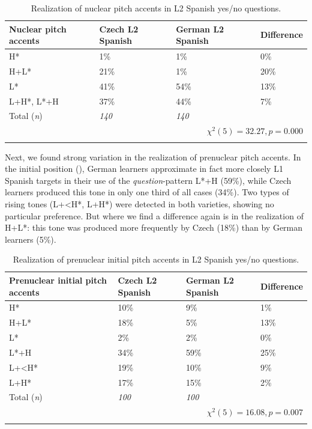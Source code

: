\begin{table}
\begin{tabularx}{\textwidth}{lYYY}

\lsptoprule

{Nuclear pitch accents} & {Czech L2 Spanish} & {German L2 Spanish} & {Difference}\\
\midrule
H* &  1\% &  1\% &  0\%\\
H+L* &  21\% &  1\% &  20\%\\
L* &  41\% &  54\% &  13\%\\
L+H*, L*+H &  37\% &  44\% &  7\%\\
\midrule
Total (\textit{n}) & {\itshape 140} &  \textit{140} &  \\
\\
\lspbottomrule
\end{tabularx}

\caption{Realization of nuclear pitch accents in L2 Spanish yes/no questions.}
\label{tab:4.19}
\end{table}

Next, we found strong variation in the realization of prenuclear pitch accents. In the initial position (), German learners approximate in fact more closely L1 Spanish targets in their use of the \textit{question}{}-pattern L*+H (59\%), while Czech learners produced this tone in only one third of all cases (34\%). Two types of rising tones (L+<H*, L+H*) were detected in both varieties, showing no particular preference. But where we find a difference again is in the realization of H+L*: this tone was produced more frequently by Czech (18\%) than by German learners (5\%).

\begin{table}
\begin{tabularx}{\textwidth}{lYYY}

\lsptoprule

{Prenuclear initial pitch accents} & {Czech L2 Spanish} & {German L2 Spanish} & {Difference}\\
\midrule
H* &  10\% &  9\% &  1\%\\
H+L* &  18\% &  5\% &  13\%\\
L* &  2\% &  2\% &  0\%\\
L*+H &  34\% &  59\% &  25\%\\
L+<H* &  19\% &  10\% &  9\%\\
L+H* &  17\% &  15\% &  2\%\\
\midrule
Total (\textit{n}) & {\itshape 100} & {\itshape 100} &  \\
\\
\lspbottomrule
\end{tabularx}

\caption{Realization of prenuclear initial pitch accents in L2 Spanish yes/no questions.}
\label{tab:4.20}
\end{table}

